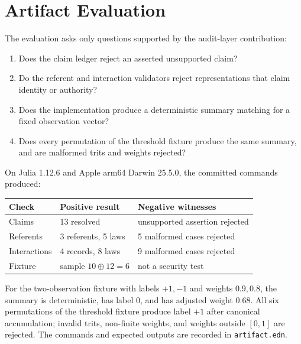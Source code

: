 \documentclass[preprint,nohyperxmp]{iacrtrans}
\begin{document}
\section{Artifact Evaluation}
\label{sec:evaluation}

The evaluation asks only questions supported by the audit-layer contribution:

\begin{enumerate}
    \item Does the claim ledger reject an asserted unsupported claim?
    \item Do the referent and interaction validators reject representations
    that claim identity or authority?
    \item Does the implementation produce a deterministic summary matching
     for a fixed observation vector?
    \item Does every permutation of the threshold fixture produce the same
    summary, and are malformed trits and weights rejected?
\end{enumerate}

On Julia 1.12.6 and Apple arm64 Darwin 25.5.0, the committed commands produced:

\begin{center}
\small
\begin{tabular}{lll}
\hline
Check & Positive result & Negative witnesses \\
\hline
Claims & 13 resolved & unsupported assertion rejected \\
Referents & 3 referents, 5 laws & 5 malformed cases rejected \\
Interactions & 4 records, 8 laws & 9 malformed cases rejected \\
Fixture & sample $10\oplus12=6$ & not a security test \\
\hline
\end{tabular}
\end{center}

For the two-observation fixture with labels $+1,-1$ and weights $0.9,0.8$,
the summary is deterministic, has label $0$, and has adjusted weight $0.68$.
All six permutations of the threshold fixture produce label $+1$ after
canonical accumulation; invalid trits, non-finite weights, and weights outside
$[0,1]$ are rejected.
The commands and expected outputs are recorded in \texttt{artifact.edn}.
\end{document}
